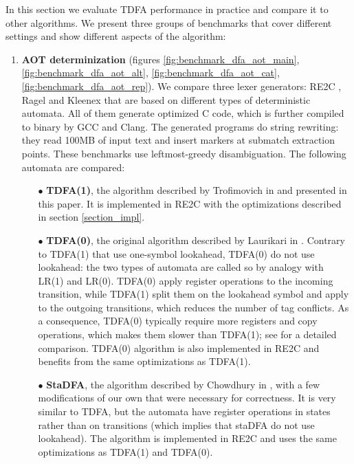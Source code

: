 \documentclass[]{article}
\begin{document}
In this section we evaluate TDFA performance in practice and compare it to other algorithms.
We present three groups of benchmarks that cover different settings and show different aspects of the algorithm:
\medskip

\begin{enumerate}%

\item
\textbf{AOT determinization}
(figures \ref{fig:benchmark_dfa_aot_main}, \ref{fig:benchmark_dfa_aot_alt}, \ref{fig:benchmark_dfa_aot_cat}, \ref{fig:benchmark_dfa_aot_rep}).
We compare three lexer generators: RE2C \cite{RE2C}, Ragel \cite{Ragel} and Kleenex \cite{Kleenex}
that are based on different types of deterministic automata.
All of them generate optimized C code, which is further compiled to binary by GCC and Clang.
The generated programs do string rewriting: they read 100MB of input text and insert markers at submatch extraction points.
These benchmarks use leftmost-greedy disambiguation.
The following automata are compared:
\medskip

\begin{itemize}

\item[$\bullet$]
\textbf{TDFA(1)}, the algorithm described by Trofimovich in \cite{Tro17} and presented in this paper.
It is implemented in RE2C with the optimizations described in section \ref{section_impl}.
\medskip

\item[$\bullet$]
\textbf{TDFA(0)}, the original algorithm described by Laurikari in \cite{Lau00}.
Contrary to TDFA(1) that use one-symbol lookahead, TDFA(0) do not use lookahead:
the two types of automata are called so by analogy with LR(1) and LR(0).
TDFA(0) apply register operations to the incoming transition,
while TDFA(1) split them on the lookahead symbol and apply to the outgoing transitions, which reduces the number of tag conflicts.
As a consequence, TDFA(0) typically require more registers and copy operations, which makes them slower than TDFA(1);
see \cite{Tro17} for a detailed comparison.
TDFA(0) algorithm is also implemented in RE2C and benefits from the same optimizations as TDFA(1).
\medskip

\item[$\bullet$]
\textbf{StaDFA}, the algorithm described by Chowdhury in \cite{Cho18},
with a few modifications of our own that were necessary for correctness.
It is very similar to TDFA, but the automata have register operations in states rather than on transitions
(which implies that staDFA do not use lookahead).
The algorithm is implemented in RE2C and uses the same optimizations as TDFA(1) and TDFA(0).
\medskip


\end{itemize}
\end{enumerate}
\end{document}
